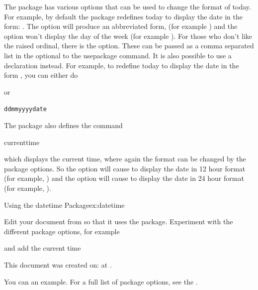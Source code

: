 The  package has various options that can be used to
change the format of \gls{today}.  For example, by default the
 package redefines \gls{today} to display the
date in the form: {\showdowtrue\longdate
\renewcommand{\fmtord}[1]{\textsuperscript{#1}}\docdate}. The option
 will produce an abbreviated form, (for
example {\shortdate\docdate}) and the option 
won't display the day of the week (for example
{\showdowfalse\docdate}).
For those who don't like the raised ordinal, there is the
 option.
These can be passed as a comma separated list in the
\gls{optional} to the
\gls{usepackage} command.  It is also possible to use a
declaration instead. For example, to redefine \gls{today} to
display the date in the form {\ddmmyyyydate\docdate}, you can either do
\begin{codeS}
\end{codeS}%
or
\begin{code}
\begin{alltt}
\gls{ddmmyyyydate}
\end{alltt}
\end{code}

The  package also defines the command
\begin{definition}
\gls{currenttime}
\end{definition}
which displays the current time, where again
the format can be changed by the package options. So the option
 will cause  to display
the date in 12 hour format (for example, \ampmtime) and the option
 will cause  to display
the date in 24 hour format (for example, \xxivtime).

\begin{exercise}{Using the datetime Package}{ex:datetime}

Edit your document from  so that it uses the 
package. Experiment with the different package options, for example
\begin{codeS}
\end{codeS}
and add the current time
\begin{codeS}
This document was created on: at .
\end{codeS}
You can  an example.
For a full list  of package options, see the
 .

\end{exercise}

